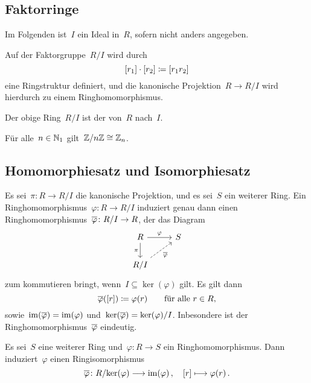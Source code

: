 \subsection{Faktorringe}

\begin{convention}
  Im Folgenden ist~$I$ ein Ideal in~$R$, sofern nicht anders angegeben.
\end{convention}

Auf der Faktorgruppe~$R/I$ wird durch
\[
  [r_1] \cdot [r_2]
  \coloneqq
  [r_1 r_2]
\]
eine Ringstruktur definiert, und die kanonische Projektion~$R \to R/I$ wird hierdurch zu einem Ringhomomorphismus.

\begin{definition}
  Der obige Ring~$R/I$ ist der  von~$R$ nach~$I$.
\end{definition}

\begin{example}
  Für alle~$n \in \mathbb{N}_1$ gilt~$\mathbb{Z} / n \mathbb{Z} \cong \mathbb{Z}_n$.
\end{example}



\subsection{Homomorphiesatz und Isomorphiesatz}


\begin{theorem}[Homomorphiesatz]
  Es sei~$\pi \colon R \to R/I$ die kanonische Projektion, und es sei~$S$ ein weiterer Ring.
  Ein Ringhomomorphismus~$\varphi \colon R \to R/I$ induziert genau dann einen Ringhomomorphismus~$\induced{\varphi} \colon R/I \to R$, der das Diagram
  \[
    \begin{tikzcd}
      R
      \arrow{r}[above]{\varphi}
      \arrow{d}[left]{\pi}
      &
      S
      \\
      R/I
      \arrow[dashed]{ur}[below right]{\induced{\varphi}}
      &
      {}
    \end{tikzcd}
  \]
  zum kommutieren bringt, wenn~$I \subseteq \ker(\varphi)$ gilt.
  Es gilt dann
  \[
    \overline{\varphi}( [r] )
    \coloneqq
    \varphi(r)
    \qquad
    \text{für alle~$r \in R$,}
  \]
  sowie~$\operatorname{im}(\overline{\varphi}) = \operatorname{im}(\varphi)$ und~$\ker(\overline{\varphi}) = \ker(\varphi)/I$.
  Inbesondere ist der Ringhomomorphismus~$\overline{\varphi}$ eindeutig.
\end{theorem}

\begin{corollary}
  Es sei~$S$ eine weiterer Ring und~$\varphi \colon R \to S$ ein Ringhomomorphismus.
  Dann induziert~$\varphi$ einen Ringisomorphismus
  \[
    \induced{\varphi}
    \colon
    R/{\ker(\varphi)} \to \im(\varphi) \,,
    \quad
    \class{r}
    \mapsto
    \varphi(r) \,.
  \]
\end{corollary}


